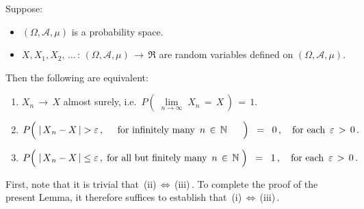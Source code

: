 \begin{lemma}\label{lemma:CharacterizationOfAlmostSureConvergence}
\mbox{}\vskip 0.1cm
\noindent
Suppose:
\begin{itemize}
\item
	$(\Omega,\mathcal{A},\mu)$ is a probability space.
\item
	$X, X_{1}, X_{2}, \,\ldots\,:\, (\Omega,\mathcal{A},\mu) \,\longrightarrow\,\Re$
	are random variables defined on $(\Omega,\mathcal{A},\mu)$.
\end{itemize}
Then the following are equivalent:
\begin{enumerate}
\item
	$X_{n} \,\longrightarrow\,X$ almost surely,
	i.e. \,$P\!\left(\;\underset{n\rightarrow\infty}{\lim}\;X_{n} \,=\, X\,\right) \, = \, 1$.
\item
	\begin{equation*}
	P\!\left(\;
		\vert\,\overset{{\color{white}.}}{X}_{n} - X\,\vert > \varepsilon\,,
		{\color{white}....}
		\;\textnormal{for infinitely many \,$n \,\in\, \N$}
		{\color{white}.....}
		\;\right)
	\;\; = \;\; 0\,,
	\quad\textnormal{for each \,$\varepsilon \,>\, 0$}\,.
	\end{equation*}
\item
	\begin{equation*}
	P\!\left(\;
		\vert\,\overset{{\color{white}.}}{X}_{n} - X\,\vert \leq \varepsilon\,,
		\;\textnormal{for all but finitely many \,$n \,\in\, \N$}
		\;\right)
	\;\; = \;\; 1\,,
	\quad\textnormal{for each \,$\varepsilon \,>\, 0$}\,.
	\end{equation*}
\end{enumerate}
\end{lemma}
\proof
First, note that it is trivial that \,(ii)\,$\Longleftrightarrow$\,(iii)\,.
To complete the proof of the present Lemma, it therefore suffices to establish that \,(i)\,$\Longleftrightarrow$\,(iii)\,.

